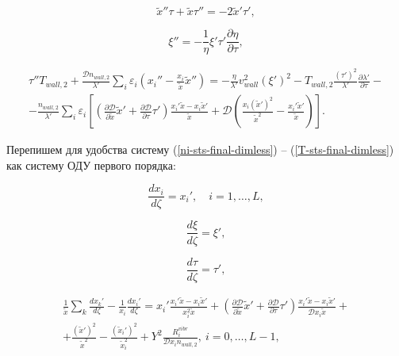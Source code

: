\documentclass[12pt]{article}
\begin{document}
\begin{equation}
  \tilde{x}''\tau + \tilde{x}\tau'' = -2\tilde{x}'\tau',
\end{equation}

\begin{equation}
  \xi'' = -\frac{1}{\eta} \xi' \tau' \frac{\partial \eta}{\partial \tau},
\end{equation}

\begin{multline}
  \tau''T_{wall,2} + \frac{\mathcal{D}n_{wall,2}}{\lambda'}\sum_{i}\varepsilon_{i}\left(x_{i}'' - \frac{x_{i}}{\tilde{x}}\tilde{x}'' \right) = -\frac{\eta}{\lambda'} v_{wall}^2 \left(\xi' \right)^2 - T_{wall,2}\frac{\left(\tau'\right)^2}{\lambda'} \frac{\partial \lambda'}{\partial \tau} - \\
  - \frac{n_{wall,2}}{\lambda'}\sum_{i}\varepsilon_{i} \left[\left(\frac{\partial \mathcal{D}}{\partial \tilde{x}}\tilde{x}' + \frac{\partial \mathcal{D}}{\partial \tau}\tau' \right) \frac{x_{i}'\tilde{x} - x_{i}\tilde{x}'}{\tilde{x}} + \mathcal{D}\left(\frac{x_{i}\left(\tilde{x}'\right)^2}{\tilde{x}^2} - \frac{x_{i}'\tilde{x}'}{\tilde{x}} \right)  \right].\label{T-sts-final-dimless}
\end{multline}

Перепишем для удобства систему (\ref{ni-sts-final-dimless}) -- (\ref{T-sts-final-dimless}) как систему ОДУ первого порядка:

\begin{equation}
  \frac{d x_{i}}{d\zeta} = x_{i}',\quad i=1,\ldots,L,\label{eqn-dx_i-sts}
\end{equation}

\begin{equation}
  \frac{d \xi}{d\zeta} = \xi', \label{eqn-dxi-sts}
\end{equation}

\begin{equation}
  \frac{d \tau}{d\zeta} = \tau', \label{eqn-dtau-sts}
\end{equation}

\begin{multline}
\frac{1}{\tilde{x}}\sum_{k}\frac{dx_{k}'}{d\zeta} - \frac{1}{x_{i}}\frac{d x_{i}'}{d\zeta} =
  x_{i}' \frac{x_{i}'\tilde{x} - x_{i}\tilde{x}'}{x_{i}^2 \tilde{x}} + \left(\frac{\partial \mathcal{D}}{\partial \tilde{x}}\tilde{x}' + \frac{\partial \mathcal{D}}{\partial \tau}\tau' \right) \frac{x_{i}'\tilde{x} - x_{i}\tilde{x}'}{\mathcal{D}x_{i}\tilde{x}} + \\
  + \frac{\left(\tilde{x}'\right)^2}{\tilde{x}^2} - \frac{\left(\tilde{x}_{i}'\right)^2}{\tilde{x}_{i}^2} + Y^{2}\frac{R_{i}^{vibr}}{\mathcal{D}x_{i}n_{wall,2}},\:i=0,\ldots,L-1,\label{eqn-d2x_i-sts}
\end{multline}
\end{document}

